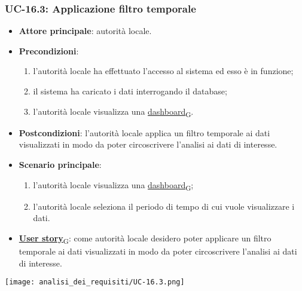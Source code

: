 \newpage
\subsubsection{UC-16.3: Applicazione filtro temporale}
\begin{itemize}
	\item \textbf{Attore principale}: autorità locale.
	\item \textbf{Precondizioni}:
	      \begin{enumerate}
		      \item l'autorità locale ha effettuato l'accesso al sistema ed esso è in funzione;
		      \item il sistema ha caricato i dati interrogando il database;
		      \item l'autorità locale visualizza una \href{https://7last.github.io/docs/pb/documentazione-interna/glossario\#dashboard}{dashboard\textsubscript{G}}.
	      \end{enumerate}
	\item \textbf{Postcondizioni}: l'autorità locale applica un filtro temporale ai dati visualizzati in modo da poter circoscrivere l'analisi ai dati di interesse.
	\item \textbf{Scenario principale}:
	      \begin{enumerate}
		      \item l'autorità locale visualizza una \href{https://7last.github.io/docs/pb/documentazione-interna/glossario\#dashboard}{dashboard\textsubscript{G}};
		      \item l'autorità locale seleziona il periodo di tempo di cui vuole visualizzare i dati.
	      \end{enumerate}
	\item \href{https://7last.github.io/docs/pb/documentazione-interna/glossario\#user-story}{\textbf{User story}\textsubscript{G}}:
	      come autorità locale desidero poter applicare un filtro temporale ai dati visualizzati in modo da poter circoscrivere l'analisi ai dati di interesse.
\end{itemize}
\begin{center}
	\texttt{[image: analisi\_dei\_requisiti/UC-16.3.png]}
\end{center}

\newpage
